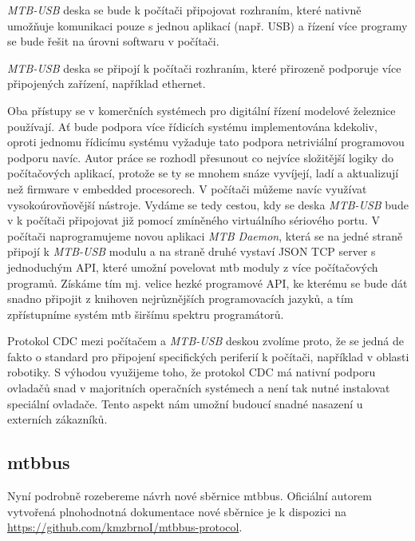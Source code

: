 \begin{compactenum}
\item \textit{MTB-USB} deska se bude k počítači připojovat rozhraním, které
	nativně umožňuje komunikaci pouze s jednou aplikací (např. USB) a řízení více
	programy se bude řešit na úrovni softwaru v počítači.
\item \textit{MTB-USB} deska se připojí k počítači rozhraním, které přirozeně
	podporuje více připojených zařízení, například ethernet.
\end{compactenum}

Oba přístupy se v komerčních systémech pro digitální řízení modelové železnice
používají. Ať bude podpora více řídicích systému implementována kdekoliv, oproti
jednomu řídicímu systému vyžaduje tato podpora netriviální programovou podporu
navíc. Autor práce se rozhodl přesunout co nejvíce složitější logiky do počítačových
aplikací, protože se ty se mnohem snáze vyvíjejí, ladí a aktualizují než firmware
v embedded procesorech. V počítači můžeme navíc využívat vysokoúrovňovější
nástroje. Vydáme se tedy cestou, kdy se deska \textit{MTB-USB} bude v k počítači
připojovat již pomocí zmíněného virtuálního sériového portu. V počítači
naprogramujeme novou aplikaci \textit{MTB Daemon}, která se na jedné straně
připojí k \textit{MTB-USB} modulu a na straně druhé vystaví JSON TCP server
s jednoduchým API, které umožní povelovat \gls{mtb} moduly z více počítačových
programů. Získáme tím mj. velice hezké programové API, ke kterému se bude dát
snadno připojit z knihoven nejrůznějších programovacích jazyků, a tím
zpřístupníme systém \gls{mtb} širšímu spektru programátorů.

Protokol CDC mezi počítačem a \textit{MTB-USB} deskou zvolíme proto, že se
jedná de fakto o standard pro připojení specifických periferií k počítači,
například v oblasti robotiky. S výhodou využijeme toho, že protokol CDC má
nativní podporu ovladačů snad v majoritních operačních systémech a není tak
nutné instalovat speciální ovladače. Tento aspekt nám umožní budoucí snadné
nasazení u externích zákazníků.

\subsection{\gls{mtbbus}}

Nyní podrobně rozebereme návrh nové sběrnice \gls{mtbbus}. Oficiální autorem
vytvořená plnohodnotná dokumentace nové sběrnice je k dispozici na
\url{https://github.com/kmzbrnoI/mtbbus-protocol}.

